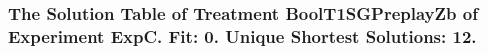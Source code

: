  \begin{frame}
 \fontsize{8pt}{9pt}\selectfont
 \frametitle{ The Solution Table of Treatment BoolT1SGPreplayZb of Experiment ExpC. Fit: 0. Unique Shortest Solutions: 12. }

 \label{ExpCSolutionTable003.tex}  
 \end{frame}

